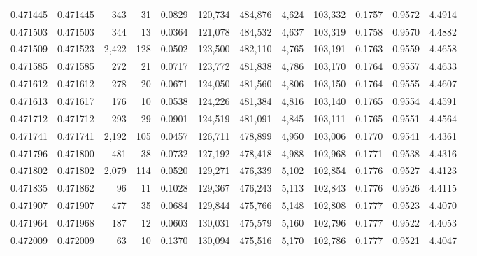 \begin{tabular}{rrrrrrrrrrrrr}
0.471445 & 0.471445 &   343 &    31 &                                     0.0829 & 120,734 & 484,876 &   4,624 & 103,332 & 0.1757 & 0.9572 & 4.4914 \\
0.471503 & 0.471503 &   344 &    13 &                                     0.0364 & 121,078 & 484,532 &   4,637 & 103,319 & 0.1758 & 0.9570 & 4.4882 \\
0.471509 & 0.471523 & 2,422 &   128 &                                     0.0502 & 123,500 & 482,110 &   4,765 & 103,191 & 0.1763 & 0.9559 & 4.4658 \\
0.471585 & 0.471585 &   272 &    21 &                                     0.0717 & 123,772 & 481,838 &   4,786 & 103,170 & 0.1764 & 0.9557 & 4.4633 \\
0.471612 & 0.471612 &   278 &    20 &                                     0.0671 & 124,050 & 481,560 &   4,806 & 103,150 & 0.1764 & 0.9555 & 4.4607 \\
0.471613 & 0.471617 &   176 &    10 &                                     0.0538 & 124,226 & 481,384 &   4,816 & 103,140 & 0.1765 & 0.9554 & 4.4591 \\
0.471712 & 0.471712 &   293 &    29 &                                     0.0901 & 124,519 & 481,091 &   4,845 & 103,111 & 0.1765 & 0.9551 & 4.4564 \\
0.471741 & 0.471741 & 2,192 &   105 &                                     0.0457 & 126,711 & 478,899 &   4,950 & 103,006 & 0.1770 & 0.9541 & 4.4361 \\
0.471796 & 0.471800 &   481 &    38 &                                     0.0732 & 127,192 & 478,418 &   4,988 & 102,968 & 0.1771 & 0.9538 & 4.4316 \\
0.471802 & 0.471802 & 2,079 &   114 &                                     0.0520 & 129,271 & 476,339 &   5,102 & 102,854 & 0.1776 & 0.9527 & 4.4123 \\
0.471835 & 0.471862 &    96 &    11 &                                     0.1028 & 129,367 & 476,243 &   5,113 & 102,843 & 0.1776 & 0.9526 & 4.4115 \\
0.471907 & 0.471907 &   477 &    35 &                                     0.0684 & 129,844 & 475,766 &   5,148 & 102,808 & 0.1777 & 0.9523 & 4.4070 \\
0.471964 & 0.471968 &   187 &    12 &                                     0.0603 & 130,031 & 475,579 &   5,160 & 102,796 & 0.1777 & 0.9522 & 4.4053 \\
0.472009 & 0.472009 &    63 &    10 &                                     0.1370 & 130,094 & 475,516 &   5,170 & 102,786 & 0.1777 & 0.9521 & 4.4047 \\

\end{tabular}
